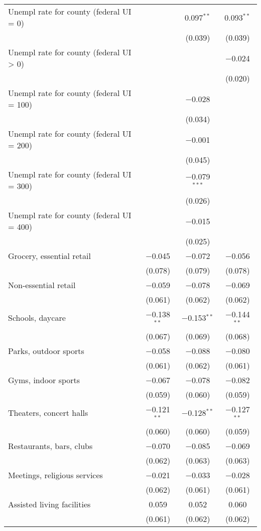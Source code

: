 \begin{table}[!htbp]
\begin{tabular}{@{\extracolsep{5pt}}lccc}
  Unempl rate for county (federal UI = 0) &  & 0.097$^{**}$ & 0.093$^{**}$ \\ 
  &  & (0.039) & (0.039) \\ 
  Unempl rate for county (federal UI > 0) &  &  & $-$0.024 \\ 
  &  &  & (0.020) \\ 
  Unempl rate for county (federal UI = 100) &  & $-$0.028 &  \\ 
  &  & (0.034) &  \\ 
  Unempl rate for county (federal UI = 200) &  & $-$0.001 &  \\ 
  &  & (0.045) &  \\ 
  Unempl rate for county (federal UI = 300) &  & $-$0.079$^{***}$ &  \\ 
  &  & (0.026) &  \\ 
  Unempl rate for county (federal UI = 400) &  & $-$0.015 &  \\ 
  &  & (0.025) &  \\ 
  Grocery, essential retail & $-$0.045 & $-$0.072 & $-$0.056 \\ 
  & (0.078) & (0.079) & (0.078) \\ 
  Non-essential retail & $-$0.059 & $-$0.078 & $-$0.069 \\ 
  & (0.061) & (0.062) & (0.062) \\ 
  Schools, daycare & $-$0.138$^{**}$ & $-$0.153$^{**}$ & $-$0.144$^{**}$ \\ 
  & (0.067) & (0.069) & (0.068) \\ 
  Parks, outdoor sports & $-$0.058 & $-$0.088 & $-$0.080 \\ 
  & (0.061) & (0.062) & (0.061) \\ 
  Gyms, indoor sports & $-$0.067 & $-$0.078 & $-$0.082 \\ 
  & (0.059) & (0.060) & (0.059) \\ 
  Theaters, concert halls & $-$0.121$^{**}$ & $-$0.128$^{**}$ & $-$0.127$^{**}$ \\ 
  & (0.060) & (0.060) & (0.059) \\ 
  Restaurants, bars, clubs & $-$0.070 & $-$0.085 & $-$0.069 \\ 
  & (0.062) & (0.063) & (0.063) \\ 
  Meetings, religious services & $-$0.021 & $-$0.033 & $-$0.028 \\ 
  & (0.062) & (0.061) & (0.061) \\ 
  Assisted living facilities & 0.059 & 0.052 & 0.060 \\ 
  & (0.061) & (0.062) & (0.062) \\ 

\end{tabular}
\end{table}
